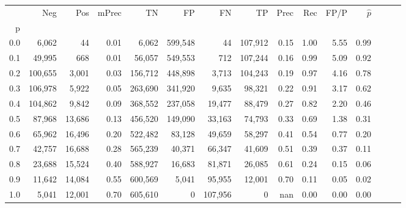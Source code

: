\begin{tabular}{rrrrrrrrrrrrrrr}
\toprule
{} &      Neg &     Pos & mPrec &       TN &       FP &       FN &       TP &  Prec &   Rec &  FP/P & $\hat{p}$ \\
p   &          &         &       &          &          &          &          &       &       &       &           \\
\midrule
0.0 &    6,062 &      44 &  0.01 &    6,062 &  599,548 &       44 &  107,912 &  0.15 &  1.00 &  5.55 &      0.99 \\
0.1 &   49,995 &     668 &  0.01 &   56,057 &  549,553 &      712 &  107,244 &  0.16 &  0.99 &  5.09 &      0.92 \\
0.2 &  100,655 &   3,001 &  0.03 &  156,712 &  448,898 &    3,713 &  104,243 &  0.19 &  0.97 &  4.16 &      0.78 \\
0.3 &  106,978 &   5,922 &  0.05 &  263,690 &  341,920 &    9,635 &   98,321 &  0.22 &  0.91 &  3.17 &      0.62 \\
0.4 &  104,862 &   9,842 &  0.09 &  368,552 &  237,058 &   19,477 &   88,479 &  0.27 &  0.82 &  2.20 &      0.46 \\
0.5 &   87,968 &  13,686 &  0.13 &  456,520 &  149,090 &   33,163 &   74,793 &  0.33 &  0.69 &  1.38 &      0.31 \\
0.6 &   65,962 &  16,496 &  0.20 &  522,482 &   83,128 &   49,659 &   58,297 &  0.41 &  0.54 &  0.77 &      0.20 \\
0.7 &   42,757 &  16,688 &  0.28 &  565,239 &   40,371 &   66,347 &   41,609 &  0.51 &  0.39 &  0.37 &      0.11 \\
0.8 &   23,688 &  15,524 &  0.40 &  588,927 &   16,683 &   81,871 &   26,085 &  0.61 &  0.24 &  0.15 &      0.06 \\
0.9 &   11,642 &  14,084 &  0.55 &  600,569 &    5,041 &   95,955 &   12,001 &  0.70 &  0.11 &  0.05 &      0.02 \\
1.0 &    5,041 &  12,001 &  0.70 &  605,610 &        0 &  107,956 &        0 &   nan &  0.00 &  0.00 &      0.00 \\
\bottomrule
\end{tabular}
